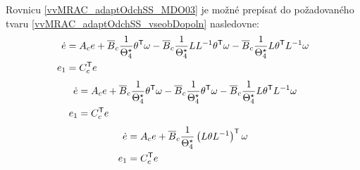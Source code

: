 \documentclass[a4paper, 10pt, ]{article}
\begin{document}
Rovnicu \eqref{vvMRAC_adaptOdchSS_MDO03} je možné prepísať do požadovaného tvaru \eqref{vvMRAC_adaptOdchSS_vseobDopoln} nasledovne:
\begin{subequations} \label{vvMRAC_adaptOdchSS_MDO04}
	\begin{align}
		\dot e &= A_c e + \overline{B}_c \frac{1}{\Theta_4^\star} \theta^{\mathsf{T}} \omega - \overline{B}_c \frac{1}{\Theta_4^\star} L L^{-1} \theta^{\mathsf{T}} \omega - \overline{B}_c \frac{1}{\Theta_4^\star} L \theta^{\mathsf{T}} L^{-1} \omega \\
		e_1 &= C_c^{\mathsf{T}} e
	\end{align}
\end{subequations}
\begin{subequations} \label{vvMRAC_adaptOdchSS_MDO05}
	\begin{align}
		\dot e &= A_c e + \overline{B}_c \frac{1}{\Theta_4^\star} \theta^{\mathsf{T}} \omega - \overline{B}_c \frac{1}{\Theta_4^\star} \theta^{\mathsf{T}} \omega - \overline{B}_c \frac{1}{\Theta_4^\star} L \theta^{\mathsf{T}} L^{-1} \omega \\
		e_1 &= C_c^{\mathsf{T}} e
    \end{align}
\end{subequations}
\begin{subequations} \label{vvMRAC_adaptOdchSS_MDO06}
	\begin{align}
		\dot e &= A_c e + \overline{B}_c \frac{1}{\Theta_4^\star} \left( L \theta L^{-1} \right)^{\mathsf{T}} \omega \\
		e_1 &= C_c^{\mathsf{T}} e
	\end{align}
\end{subequations}
\end{document}
